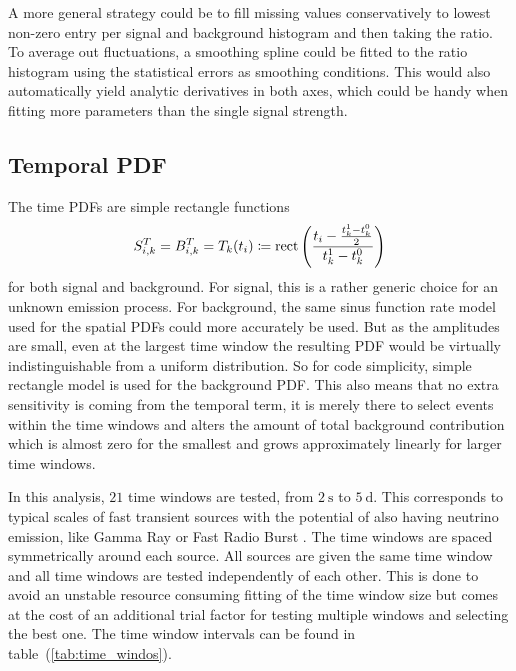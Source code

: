 A more general strategy could be to fill missing values conservatively to lowest non-zero entry per signal and background histogram and then taking the ratio.
To average out fluctuations, a smoothing spline could be fitted to the ratio histogram using the statistical errors as smoothing conditions.
This would also automatically yield analytic derivatives in both axes, which could be handy when fitting more parameters than the single signal strength.

\subsection*{Temporal PDF}
The time PDFs are simple rectangle functions
\begin{equation}
  S_{i,k}^T = B_{i,k}^T = T_k(t_i) \coloneqq
    \operatorname{rect}\left(\frac{t_i - \frac{t_k^1-t_k^0}{2}}
                              {t_k^1-t_k^0}\right)
\end{equation}
for both signal and background.
For signal, this is a rather generic choice for an unknown emission process.
For background, the same sinus function rate model used for the spatial PDFs could more accurately be used.
But as the amplitudes are small, even at the largest time window the resulting PDF would be virtually indistinguishable from a uniform distribution.
So for code simplicity, simple rectangle model is used for the background PDF.
This also means that no extra sensitivity is coming from the temporal term, it is merely there to select events within the time windows and alters the amount of total background contribution which is almost zero for the smallest and grows approximately linearly for larger time windows.

In this analysis, $\num{21}$ time windows are tested, from $\SI{2}{\second}$ to $\SI{5}{\day}$.
This corresponds to typical scales of fast transient sources with the potential of also having neutrino emission, like Gamma Ray or Fast Radio Burst \cite{Gompertz:2017bif,Hessels:2018zvt}.
The time windows are spaced symmetrically around each source.
All sources are given the same time window and all time windows are tested independently of each other.
This is done to avoid an unstable resource consuming fitting of the time window size but comes at the cost of an additional trial factor for testing multiple windows and selecting the best one.
The time window intervals can be found in table~(\ref{tab:time_windos}).

